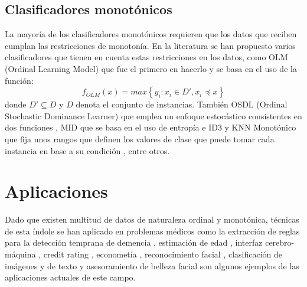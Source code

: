 \subsection{Clasificadores monotónicos}
La mayoría de los clasificadores monotónicos requieren que los datos que reciben cumplan las restricciones de monotonía. En la literatura se han propuesto varios clasificadores que tienen en cuenta estas restricciones en los datos, como OLM (Ordinal Learning Model) \cite{ben1989learning} que fue el primero en hacerlo y se basa en el uso de la función: $$ f_{OLM}(x) = max \left\{ y_i: x_i \in D', x_i \preceq x \right\}$$ donde $D' \subseteq D $ y $D$ denota el conjunto de instancias. También OSDL (Ordinal Stochastic Dominance Learner) que emplea un enfoque estocástico consistentes en dos funciones \cite{lievens2008probabilistic}, MID que se basa en el uso de entropía e ID3 \cite{ben1995monotonicity} y KNN Monotónico que fija unos rangos que definen los valores de clase que puede tomar cada instancia en base a su condición \cite{duivesteijn2008nearest}, entre otros.
\section{Aplicaciones}
Dado que existen multitud de datos de naturaleza ordinal y monotónica, técnicas de esta índole se han aplicado en problemas médicos \cite{bender1997ordinal} como la extracción de reglas para la detección temprana de demencia \cite{pazzani2001acceptance}, estimación de edad \cite{chang2011ordinal}, interfaz cerebro-máquina \cite{yoon2011bayesian}, credit rating \cite{kwon1997ordinal}, econometía \cite{mathieson1996ordinal}, reconocimiento facial \cite{kim2010structured}, clasificación de imágenes \cite{tian2014comparative} y de texto \cite{baccianella2014feature} y asesoramiento de belleza facial \cite{yan2014cost} son algunos ejemplos de las aplicaciones actuales de este campo.

